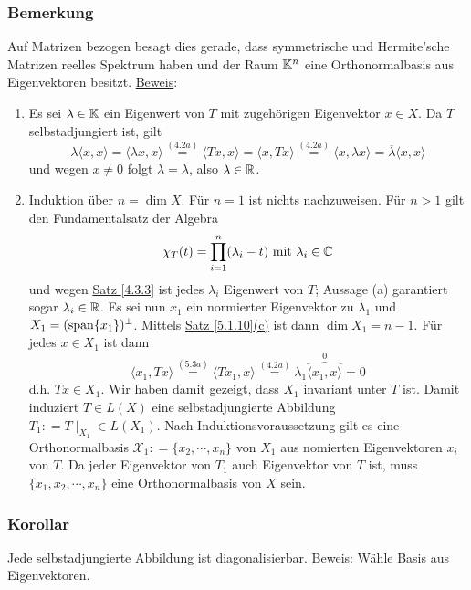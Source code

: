 \subsubsection{Bemerkung}
Auf Matrizen bezogen besagt dies gerade, dass symmetrische und Hermite'sche Matrizen reelles Spektrum haben und der Raum $\mathbb{K} ^n$ eine Orthonormalbasis aus Eigenvektoren besitzt.
\underline{Beweis}: 
\begin{enumerate}
\item Es sei $\lambda \in \mathbb{K}$ ein Eigenwert von $T$ mit zugehörigen Eigenvektor $x\in X$.  Da $T$ selbstadjungiert ist, gilt
\[\lambda \langle x,x\rangle = \langle \lambda x,x\rangle \stackrel{\hyperref[4.2a]{(4.2a)}}{=}\langle Tx,x\rangle = \langle x,Tx\rangle \stackrel{\hyperref[4.2a]{(4.2a)}}{=} \langle x,\lambda x\rangle = \overline{\lambda}\langle x,x\rangle\]
und wegen $x\not=0$ folgt $\lambda =\overline{\lambda}$, also $\lambda \in \mathbb{R}$.
\item Induktion über $n=\dim X$.  Für $n=1$ ist nichts nachzuweisen.  Für $n>1$ gilt den Fundamentalsatz der Algebra
\[\chi _T(t)=\prod _{i=1}^n(\lambda _i-t)\text{ mit }\lambda _i\in \mathbb{C}\]
und wegen \hyperref[4.3.3]{Satz \ref{4.3.3}} ist jedes $\lambda _i$ Eigenwert von $T$;
Aussage (a) garantiert sogar $\lambda _i\in \mathbb{R}$.  Es sei nun $x_1$ ein normierter Eigenvektor zu $\lambda _1$ und $X_1=(\operatorname{span} \{x_1\})^\bot$.  Mittels \hyperref[5.1.10]{Satz \ref{5.1.10}(c)} ist dann $\dim X_1=n-1$.  Für jedes $x\in X_1$ ist dann
\[\langle x_1,Tx\rangle \stackrel{\hyperref[5.3a]{(5.3a)}}{=}\langle Tx_1,x\rangle \stackrel{\hyperref[4.2a]{(4.2a)}}{=}\lambda _1\overbrace{\langle x_1,x\rangle}^0=0\]
d.h. $Tx\in X_1$.  Wir haben damit gezeigt, dass $X_1$ invariant unter $T$ ist.  Damit induziert $T\in L(X)$ eine selbstadjungierte Abbildung $T_1\colon =T\mid _{X_1}\in L(X_1)$.  Nach Induktionsvoraussetzung gilt es eine Orthonormalbasis $\mathcal{X}_1\colon =\{x_2,\cdots ,x_n\}$ von $X_1$ aus nomierten Eigenvektoren $x_i$ von $T$.  Da jeder Eigenvektor von $T_1$ auch Eigenvektor von $T$ ist, muss $\{x_1,x_2,\cdots ,x_n\}$ eine Orthonormalbasis von $X$ sein.
\end{enumerate}
\subsubsection{Korollar}
Jede selbstadjungierte Abbildung ist diagonalisierbar.
\underline{Beweis}: Wähle Basis aus Eigenvektoren.